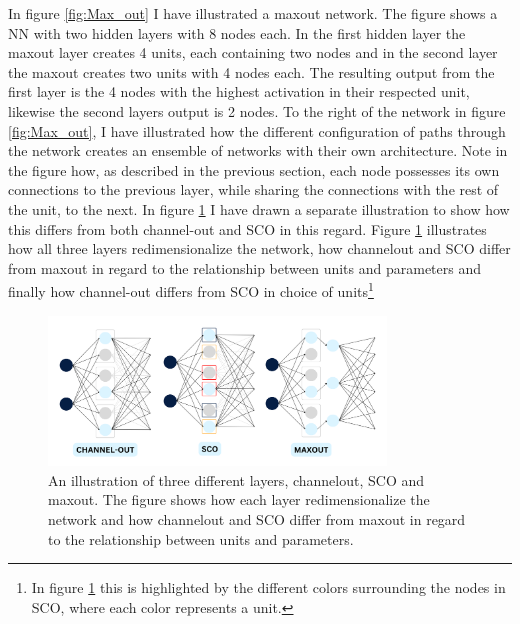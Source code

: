 In figure \ref{fig:Max_out} I have illustrated a maxout network. The figure shows a \ac{NN} with two hidden layers
with 8 nodes each. In the first hidden layer the maxout layer creates 4 units, each containing two nodes and in the 
second layer the maxout creates two units with 4 nodes each. The resulting output from the first layer is the 
4 nodes with the highest activation in their respected unit, likewise the second layers output is 2 nodes.
To the right of the network in figure \ref{fig:Max_out}, I have illustrated how the different configuration of 
paths through the network creates an ensemble of networks with their own architecture. Note in the figure how, as described in the 
previous section, each node possesses its own connections to the previous layer, while sharing the connections with the 
rest of the unit, to the next. In figure \ref{fig:NetEnsembleComp} I have drawn a separate illustration to show how 
this differs from both channel-out and \ac{SCO} in this regard. Figure \ref{fig:NetEnsembleComp} illustrates how 
all three layers redimensionalize the network, how channelout and \ac{SCO} differ from maxout in regard to the relationship 
between units and parameters and finally how channel-out differs from \ac{SCO} in choice of units\footnote{In figure 
\ref{fig:NetEnsembleComp} this is highlighted by the different colors surrounding the nodes in \ac{SCO}, where each color 
represents a unit.}
\begin{figure}
    \centering
    \includegraphics[width=0.8\textwidth]{Figures/Illustrations/EnsembleComp.png}
    \caption{An illustration of three different layers, channelout, \ac{SCO} and maxout. The figure shows how each layer 
    redimensionalize the network and how channelout and \ac{SCO} differ from maxout in regard to the relationship 
    between units and parameters.}
    \label{fig:NetEnsembleComp}
\end{figure}
